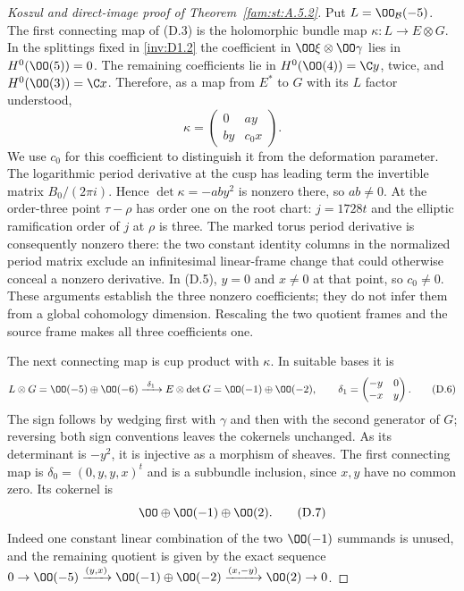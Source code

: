 \begin{proof}[Koszul and direct-image proof of Theorem~\ref{fam:st:A.5.2}]
Put $L=\OO_{\mathcal B}(-5)$. The first connecting map of (D.3) is
the holomorphic bundle map
$\kappa:L\to E\otimes G$. In the splittings fixed in \ref{inv:D1.2} the
coefficient in $\OO\xi\otimes\OO\gamma$ lies in $H^0(\OO(5))=0$.
The remaining coefficients lie in
$H^0(\OO(4))=\C y$, twice, and $H^0(\OO(3))=\C x$.
Therefore, as a map from $E^*$ to $G$ with its $L$ factor understood,
\[
 \kappa=\begin{pmatrix}0&a y\\ b y&c_0x\end{pmatrix}. \tag{D.5}
\]
We use $c_0$ for this coefficient to distinguish it from the deformation
parameter. The logarithmic period derivative at the cusp has leading
term the invertible matrix $B_0/(2\pi i)$. Hence
$\det\kappa=-ab y^2$ is nonzero there, so $ab\ne0$.
At the order-three point $\tau-\rho$ has order one on the root chart:
$j=1728t$ and the elliptic ramification order of $j$ at $\rho$ is
three. The marked torus period derivative is consequently nonzero
there: the two constant identity columns in the normalized period
matrix exclude an infinitesimal linear-frame change that could
otherwise conceal a nonzero derivative. In (D.5), $y=0$ and
$x\ne0$ at that point, so $c_0\ne0$.
These arguments establish the three nonzero coefficients; they do not
infer them from a global cohomology dimension. Rescaling the two
quotient frames and the source frame makes all three coefficients one.

The next connecting map is cup product with $\kappa$. In suitable
bases it is
\[
 L\otimes G=\OO(-5)\oplus\OO(-6)
 \xrightarrow{\ \delta_1\ }
 E\otimes\det G=\OO(-1)\oplus\OO(-2),\qquad
 \delta_1=\begin{pmatrix}-y&0\\-x&y\end{pmatrix}.       \tag{D.6}
\]
The sign follows by wedging first with $\gamma$ and then with the
second generator of $G$; reversing both sign conventions leaves the
cokernels unchanged. As its determinant is $-y^2$, it is injective as
a morphism of sheaves. The first connecting map is
$\delta_0=(0,y,y,x)^t$ and is a subbundle inclusion, since $x,y$ have
no common zero. Its cokernel is
\[
 \OO\oplus\OO(-1)\oplus\OO(2).                       \tag{D.7}
\]
Indeed one constant linear combination of the two $\OO(-1)$ summands
is unused, and the remaining quotient is given by the exact sequence
$0\to\OO(-5)\xrightarrow{(y,x)}\OO(-1)\oplus\OO(-2)
\xrightarrow{(x,-y)}\OO(2)\to0$.


\end{proof}
